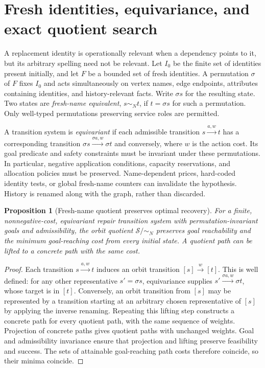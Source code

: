\documentclass[11pt,a4paper]{article}
\newtheorem{proposition}{Proposition}
\begin{document}
\section{Fresh identities, equivariance, and exact quotient search}
A replacement identity is operationally relevant when a dependency points to it, but its arbitrary spelling need not be relevant. Let $I_0$ be the finite set of identities present initially, and let $F$ be a bounded set of fresh identities. A permutation $\sigma$ of $F$ fixes $I_0$ and acts simultaneously on vertex names, edge endpoints, attributes containing identities, and history-relevant facts. Write $\sigma s$ for the resulting state. Two states are \emph{fresh-name equivalent}, $s\sim_N t$, if $t=\sigma s$ for such a permutation. Only well-typed permutations preserving service roles are permitted.

A transition system is \emph{equivariant} if each admissible transition $s\xrightarrow{a,w}t$ has a corresponding transition $\sigma s\xrightarrow{\sigma a,w}\sigma t$ and conversely, where $w$ is the action cost. Its goal predicate and safety constraints must be invariant under these permutations. In particular, negative application conditions, capacity reservations, and allocation policies must be preserved. Name-dependent prices, hard-coded identity tests, or global fresh-name counters can invalidate the hypothesis. History is renamed along with the graph, rather than discarded.

\begin{proposition}[Fresh-name quotient preserves optimal recovery]\label{prop:symmetry}
For a finite, nonnegative-cost, equivariant repair transition system with permutation-invariant goals and admissibility, the orbit quotient $\mathcal S/{\sim_N}$ preserves goal reachability and the minimum goal-reaching cost from every initial state. A quotient path can be lifted to a concrete path with the same cost.
\end{proposition}
\begin{proof}
Each transition $s\xrightarrow{a,w}t$ induces an orbit transition $[s]\xrightarrow{w}[t]$. This is well defined: for any other representative $s'=\sigma s$, equivariance supplies $s'\xrightarrow{\sigma a,w}\sigma t$, whose target is in $[t]$. Conversely, an orbit transition from $[s]$ may be represented by a transition starting at an arbitrary chosen representative of $[s]$ by applying the inverse renaming. Repeating this lifting step constructs a concrete path for every quotient path, with the same sequence of weights. Projection of concrete paths gives quotient paths with unchanged weights. Goal and admissibility invariance ensure that projection and lifting preserve feasibility and success. The sets of attainable goal-reaching path costs therefore coincide, so their minima coincide.\end{proof}
\end{document}
